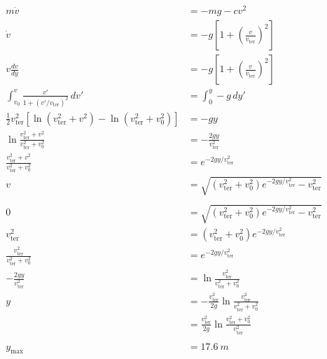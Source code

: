 \documentclass{article}
\begin{document}
\begin{align*}
  m \dot{v}                                                                              & = -m g - c v^2                                                                  \\
  \dot{v}                                                                                & = -g \left[ 1 + \left( \frac{v}{v_\text{ter}} \right)^2 \right]                 \\
  v \frac{d v}{d y}                                                                      & = -g \left[ 1 + \left( \frac{v}{v_\text{ter}} \right)^2 \right]                 \\
  \int_{v_0}^v \frac{v'}{1 + (v' / v_\text{ter})^2} \,d v'                               & = \int_0^y -g \,d y'                                                            \\
  \frac{1}{2} v_\text{ter}^2 [\ln (v_\text{ter}^2 + v^2) - \ln (v_\text{ter}^2 + v_0^2)] & = -g y                                                                          \\
  \ln \frac{v_\text{ter}^2 + v^2}{v_\text{ter}^2 + v_0^2}                                & = -\frac{2 g y}{v_\text{ter}^2}                                                 \\
  \frac{v_\text{ter}^2 + v^2}{v_\text{ter}^2 + v_0^2}                                    & = e^{-2 g y / v_\text{ter}^2}                                                   \\
  v                                                                                      & = \sqrt{(v_\text{ter}^2 + v_0^2) e^{-2 g y / v_\text{ter}^2} - v_\text{ter}^2}  \\ \\
  0                                                                                      & = \sqrt{(v_\text{ter}^2 + v_0^2) e^{-2 g y / v_\text{ter}^2} - v_\text{ter}^2}  \\
  v_\text{ter}^2                                                                         & = (v_\text{ter}^2 + v_0^2) e^{-2 g y / v_\text{ter}^2}                          \\
  \frac{v_\text{ter}^2}{v_\text{ter}^2 + v_0^2}                                          & = e^{-2 g y / v_\text{ter}^2}                                                   \\
  -\frac{2 g y}{v_\text{ter}^2}                                                          & = \ln \frac{v_\text{ter}^2}{v_\text{ter}^2 + v_0^2}                             \\
  y                                                                                      & = -\frac{v_\text{ter}^2}{2 g} \ln \frac{v_\text{ter}^2}{v_\text{ter}^2 + v_0^2} \\
                                                                                         & = \frac{v_\text{ter}^2}{2 g} \ln \frac{v_\text{ter}^2 + v_0^2}{v_\text{ter}^2}  \\ \\
  y_\text{max}                                                                           & = \qty{17.6}{m}
\end{align*}
\end{document}
